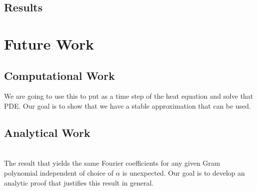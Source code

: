 \documentclass[11pt]{amsart}
\begin{document}
\subsection{Results} 
\section{Future Work} 
\subsection{Computational Work} 
We are going to use this to put as a time step of the heat equation and solve that PDE.  Our goal is to show that we have a stable approximation that can be used. 
\subsection{Analytical Work} \\
The result that yields the same Fourier coefficients for any given Gram polynomial independent of choice of $\alpha$ is unexpected.  Our goal is to develop an analytic proof that justifies this result in general. \\
\end{document}
